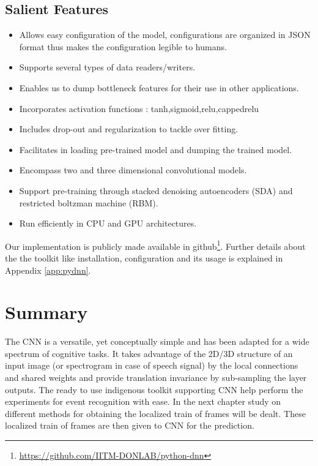 \subsection{Salient Features}
\begin{itemize}
	\item Allows easy configuration of the model, configurations are organized in JSON format thus makes the configuration legible to humans.
	\item Supports several types of data readers/writers. 
	\item Enables us to dump bottleneck features for their use in other applications.
	\item Incorporates activation functions : tanh,sigmoid,relu,cappedrelu
	\item Includes drop-out and regularization to tackle over fitting.
	\item Facilitates in loading pre-trained model and dumping the trained model.
	\item Encompass two and three dimensional convolutional models.
	\item Support pre-training through stacked denoising autoencoders (SDA) and restricted boltzman machine (RBM).
	\item Run efficiently in CPU and GPU architectures.	
\end{itemize}
Our implementation is publicly made available in github\footnote{\url{https://github.com/IITM-DONLAB/python-dnn}}.  Further details about the the toolkit like installation, configuration and its usage is explained in Appendix \ref{app:pydnn}.

\section{Summary}
The CNN is a versatile, yet conceptually simple and has been adapted for a wide spectrum of cognitive tasks.  It takes advantage of the 2D/3D structure of an input image (or spectrogram in case of speech signal) by the local connections and shared weights and provide translation invariance by sub-sampling the layer outputs.  The ready to use indigenous toolkit supporting CNN help perform the experiments for event recognition with ease.  In the next chapter study on different methods for obtaining the localized train of frames will be dealt.  These localized train of frames are then given to CNN for the prediction.